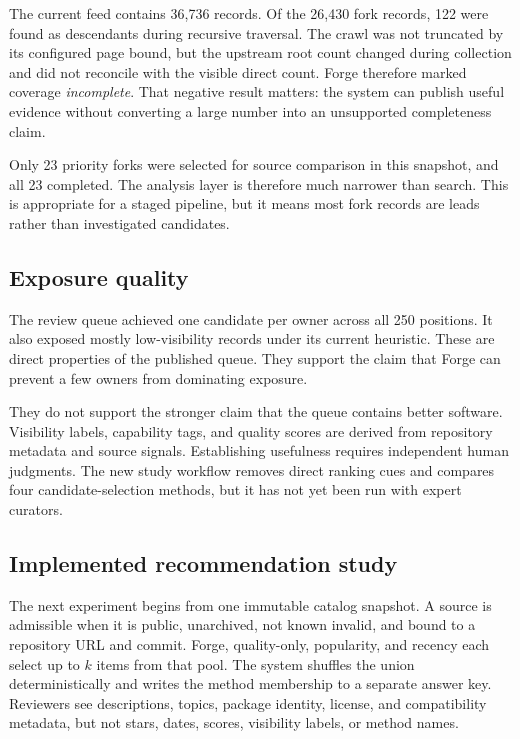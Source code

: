 \documentclass[10pt,twocolumn]{article}
\begin{document}
The current feed contains 36,736 records. Of the 26,430 fork records, 122 were found as descendants during recursive traversal. The crawl was not truncated by its configured page bound, but the upstream root count changed during collection and did not reconcile with the visible direct count. Forge therefore marked coverage \emph{incomplete}. That negative result matters: the system can publish useful evidence without converting a large number into an unsupported completeness claim.\cite{feedrelease,registry}

Only 23 priority forks were selected for source comparison in this snapshot, and all 23 completed. The analysis layer is therefore much narrower than search. This is appropriate for a staged pipeline, but it means most fork records are leads rather than investigated candidates.

\subsection{Exposure quality}

The review queue achieved one candidate per owner across all 250 positions. It also exposed mostly low-visibility records under its current heuristic. These are direct properties of the published queue. They support the claim that Forge can prevent a few owners from dominating exposure.

They do not support the stronger claim that the queue contains better software. Visibility labels, capability tags, and quality scores are derived from repository metadata and source signals. Establishing usefulness requires independent human judgments. The new study workflow removes direct ranking cues and compares four candidate-selection methods, but it has not yet been run with expert curators.

\subsection{Implemented recommendation study}

The next experiment begins from one immutable catalog snapshot. A source is admissible when it is public, unarchived, not known invalid, and bound to a repository URL and commit. Forge, quality-only, popularity, and recency each select up to $k$ items from that pool. The system shuffles the union deterministically and writes the method membership to a separate answer key. Reviewers see descriptions, topics, package identity, license, and compatibility metadata, but not stars, dates, scores, visibility labels, or method names.
\end{document}

